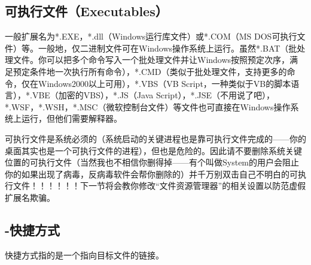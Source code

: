 \subsection{可执行文件（Executables）}
\label{sec:exe}一般扩展名为*.EXE，*.dll（Windows运行库文件）或*.COM（MS DOS可执行文件）等。一般地，仅二进制文件可在Windows操作系统上运行。虽然*.BAT（批处理文件。你可以把多个命令写入一个批处理文件并让Windows按照预定次序，满足预定条件地一次执行所有命令），*.CMD（类似于批处理文件，支持更多的命令，仅在Windows2000以上可用），*.VBS（VB Script，一种类似于VB的脚本语言），*.VBE（加密的VBS），*.JS（Java Script），*.JSE（不用说了吧），*.WSF，*.WSH，*.MSC（微软控制台文件）等文件也可直接在Windows操作系统上运行，但他们需要解释器。\par
可执行文件是系统必须的（系统启动的关键进程也是靠可执行文件完成的——你的桌面其实也是一个可执行文件的进程），但也是危险的。因此请不要删除系统关键位置的可执行文件（当然我也不相信你删得掉——有个叫做System的用户会阻止你的如果出现了病毒，反病毒软件会帮你删除的）并{\color{red}千万别双击自己不明白的可执行文件！！！！！！}下一节将会教你修改“文件资源管理器”的相关设置以防范虚假扩展名欺骗。
\subsection{-快捷方式}
快捷方式指的是一个指向目标文件的链接。

